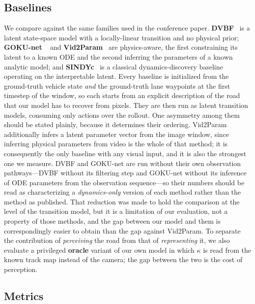 \documentclass[preprint,12pt]{elsarticle}
\begin{document}
\subsection{Baselines}\label{sec:baselines}

We compare against the same families used in the conference paper.
\textbf{DVBF}~\cite{karl2016deep} is a latent state-space model with a
locally-linear transition and no physical prior; \textbf{GOKU-net}
~\cite{linial_generative_2021} and \textbf{Vid2Param}~\cite{asenov2019vid2param}
are physics-aware, the first constraining its latent to a known ODE and the second
inferring the parameters of a known analytic model; and
\textbf{SINDYc}~\cite{BRUNTON2016710} is a classical dynamics-discovery baseline
operating on the interpretable latent.
Every baseline is initialized from the ground-truth vehicle state \emph{and} the
ground-truth lane waypoints at the first timestep of the window, so each starts
from an explicit description of the road that our model has to recover from
pixels.
They are then run as latent transition models, consuming only actions over the
rollout.
One asymmetry among them should be stated plainly, because it determines their
ordering.
Vid2Param additionally infers a latent parameter vector from the image window,
since inferring physical parameters from video is the whole of that method; it is
consequently the only baseline with any visual input, and it is also the strongest
one we measure.
DVBF and GOKU-net are run without their own observation pathways---DVBF without
its filtering step and GOKU-net without its inference of ODE parameters from the
observation sequence---so their numbers should be read as characterizing a
\emph{dynamics-only} version of each method rather than the method as published.
That reduction was made to hold the comparison at the level of the transition
model, but it is a limitation of our evaluation, not a property of those methods,
and the gap between our model and them is correspondingly easier to obtain than
the gap against Vid2Param.
To separate the contribution of \emph{perceiving} the road from that of
\emph{representing} it, we also evaluate a privileged \textbf{oracle} variant of
our own model in which $\kappa$ is read from the known track map instead of the
camera; the gap between the two is the cost of perception.

\subsection{Metrics}
\end{document}
